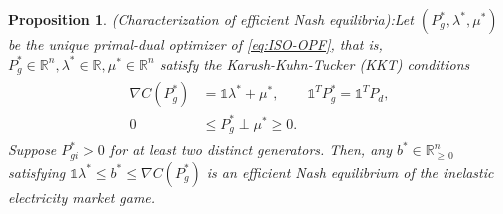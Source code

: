 \documentclass[journal]{IEEEtran}
\newcommand{\1}{\mathds 1}
\newcommand{\n}{\nabla}
\newcommand{\real}{\mathbb{R}}
\newcommand{\realnonnegative}{{\mathbb{R}}_{\ge 0}}
\newcommand{\longthmtitle}[1]{\mbox{}\textup{\textsl{(#1):}}}
\renewcommand{\l}{\lambda}
\newtheorem{proposition}[theorem]{Proposition}
\theoremstyle{remark}
\newtheorem{remark}[theorem]{Remark}
\theoremstyle{definition}
\newcommand{\blue}[1]{{\color{blue}#1}}         %
\newcommand{\marginac}[1]{\marginpar{\color{magenta}\tiny\ttfamily#1}}
\begin{document}
\begin{proposition}\longthmtitle{Characterization of efficient Nash
    equilibria}\label{prop:exis-NE}
  Let $( P_{g}^*,\l^*,\mu^*)$ be the unique primal-dual optimizer of
  \eqref{eq:ISO-OPF},
  that is, $P_{g}^*\in\real^n,\l^*\in\real,\mu^*\in\real^n$ satisfy
  the Karush-Kuhn-Tucker (KKT) conditions
  \begin{align}\label{eq:KKTcon-sc}
    \begin{aligned}
      \n C(P_g^*)&=\1\l^*+\mu^*, \qquad \1^TP_g^*=\1^TP_d, 
      \\
      0&\leq P_g^*\perp \mu^*\geq 0.
    \end{aligned}
  \end{align}
  Suppose $P_{gi}^*>0$ for at least two distinct generators. Then, any
  $b^* \in \realnonnegative^n$ satisfying $\1\l^*\leq b^*\leq \nabla
  C(P_g^*)$ is an efficient Nash equilibrium of the inelastic
  electricity market game.
\end{proposition}
\end{document}
